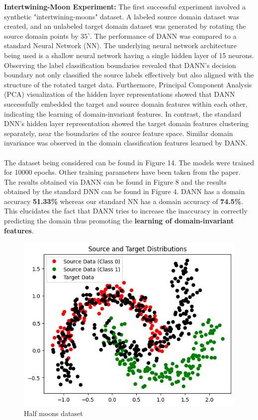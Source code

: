 \documentclass{article}
\begin{document}
\textbf{Intertwining-Moon Experiment:}
The first successful experiment involved a synthetic "intertwining-moons" dataset. A labeled source domain dataset was created, and an unlabeled target domain dataset was generated by rotating the source domain points by $35^\circ$. The performance of DANN was compared to a standard Neural Network (NN). The underlying neural network architecture being used is a shallow neural network having a single hidden layer of 15 neurons. Observing the label classification boundaries revealed that DANN's decision boundary not only classified the source labels effectively but also aligned with the structure of the rotated target data. Furthermore, Principal Component Analysis (PCA) visualization of the hidden layer representations showed that DANN successfully embedded the target and source domain features within each other, indicating the learning of domain-invariant features. In contrast, the standard DNN's hidden layer representation showed the target domain features clustering separately, near the boundaries of the source feature space. Similar domain invariance was observed in the domain classification features learned by DANN.
\\
\\
The dataset being considered can be found in Figure 14. The models were trained for 10000 epochs. Other training parameters have been taken from the paper. The results obtained via DANN can be found in Figure 8 and the results obtained by the standard DNN can be found in Figure 4. DANN has a domain accuracy \textbf{51.33\%} whereas our standard NN has a domain accuracy of \textbf{74.5\%}. This elucidates the fact that DANN tries to increase the inaccuracy in correctly predicting the domain thus promoting the \textbf{learning of domain-invariant features}.
\begin{figure}
    \centering
    \includegraphics[width=0.5\linewidth]{images/DANN/moon.png}
    \caption{Half moons dataset}
    \label{fig:enter-label}
\end{figure}
\end{document}

